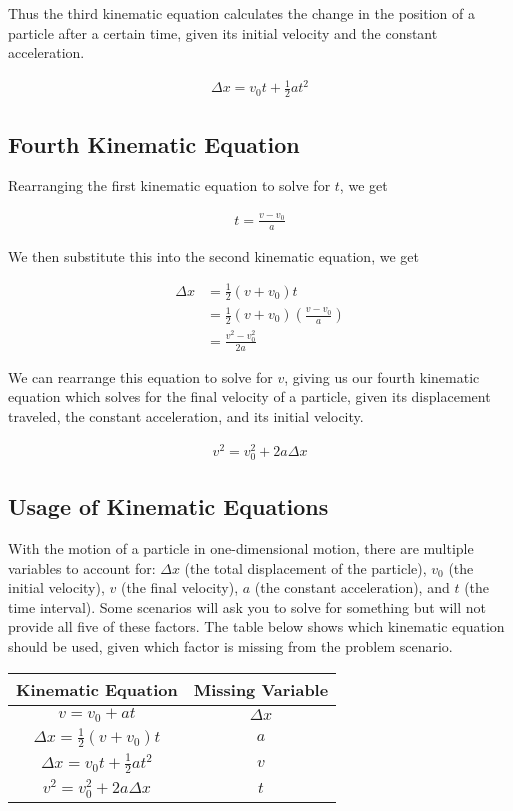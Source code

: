 \documentclass[11pt]{report}
\begin{document}
Thus the third kinematic equation calculates the change in the position of a particle after a certain time, given its initial velocity and the constant acceleration.

\begin{align*}
    \Delta x = v_{0}t + \frac{1}{2}at^{2}
\end{align*}

\subsection{Fourth Kinematic Equation}

Rearranging the first kinematic equation to solve for $t$, we get

\begin{align*}
    t = \frac{v - v_{0}}{a}
\end{align*}

We then substitute this into the second kinematic equation, we get

\begin{align*}
    \Delta x &= \frac{1}{2}(v + v_{0})t \\
             &= \frac{1}{2}(v + v_{0})\left(\frac{v - v_{0}}{a}\right) \\
             &= \frac{v^{2} - v_{0}^2}{2a}
\end{align*}

We can rearrange this equation to solve for $v$, giving us our fourth kinematic equation which solves for the final velocity of a particle, given its displacement traveled, the constant acceleration, and its initial velocity.

\begin{align*}
    v^{2} = v_{0}^{2} + 2a\Delta x
\end{align*}

\subsection{Usage of Kinematic Equations}

With the motion of a particle in one-dimensional motion, there are multiple variables to account for: $\Delta x$ (the total displacement of the particle), $v_{0}$ (the initial velocity), $v$ (the final velocity), $a$ (the constant acceleration), and $t$ (the time interval). Some scenarios will ask you to solve for something but will not provide all five of these factors. The table below shows which kinematic equation should be used, given which factor is missing from the problem scenario. 

\begin{table}[H]
    \centering
    \begin{tabular}{c|c}
        Kinematic Equation & Missing Variable \\
        \hline
        $v = v_{0} + at$ & $\Delta x$ \\
        $\Delta x = \frac{1}{2}(v + v_{0})t$ & $a$ \\
        $\Delta x = v_{0}t + \frac{1}{2}at^{2}$ & $v$ \\
        $v^{2} = v_{0}^{2} + 2a\Delta x$ & $t$ \\
    \end{tabular}
\end{table}
\end{document}
